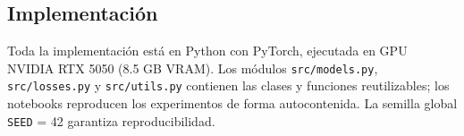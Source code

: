 \subsection{Implementación}
\label{subsec:implementacion}

Toda la implementación está en Python con PyTorch, ejecutada en GPU NVIDIA RTX 5050
(8.5 GB VRAM).
Los módulos \texttt{src/models.py}, \texttt{src/losses.py} y \texttt{src/utils.py}
contienen las clases y funciones reutilizables; los notebooks reproducen los experimentos
de forma autocontenida.
La semilla global \texttt{SEED} = 42 garantiza reproducibilidad.
